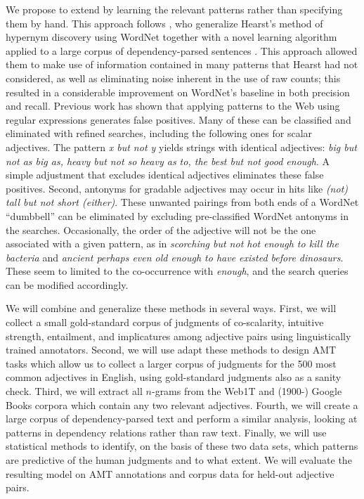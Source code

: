 \documentclass[10pt]{article}
\begin{document}
We propose to extend \cite{sheinmanetal2013} by learning the relevant patterns rather than specifying them by hand. 
This approach follows \cite{snow04,snow2006semantic}, who generalize Hearst's \cite{hearst1992automatic} method of hypernym discovery using WordNet together with a novel learning algorithm applied to a large corpus of dependency-parsed sentences \cite{de2006generating}.
 This approach allowed them to make use of information contained in many patterns that Hearst had not considered, as well as eliminating noise inherent in the use of raw counts; this resulted in a considerable improvement on WordNet's baseline in both precision and recall. 
 Previous work has shown that applying patterns to the Web using regular expressions generates false positives. Many of these can be classified and eliminated with refined searches, including the following ones for scalar adjectives. 
The pattern \emph{x but not y} yields strings with identical adjectives: \emph{big but not as big as, heavy but not so heavy as to, the best but not good enough}. A simple adjustment that excludes identical adjectives eliminates these false positives. Second, antonyms for gradable adjectives may occur in hits like \emph{(not) tall but not short (either)}.  These unwanted pairings from both ends of a WordNet “dumbbell” can be eliminated by excluding pre-classified WordNet antonyms in the searches. Occasionally, the order of the adjective will not be the one associated with a given pattern, as in \emph{scorching but not hot enough to kill the bacteria} and \emph{ancient perhaps even old enough to have existed before dinosaurs}. These seem to limited to the co-occurrence with \emph{enough}, and the search queries can be modified accordingly.

We will combine and generalize these methods in several ways. First, we will collect a small gold-standard corpus of judgments of co-scalarity, intuitive strength, entailment, and implicatures among adjective pairs using linguistically trained annotators. Second, we will use adapt these methods to design AMT tasks which allow us to collect a larger corpus of judgments for the 500 most common adjectives in English, using gold-standard judgments also as a sanity check. Third, we will extract all $n$-grams from the Web1T and (1900-) Google Books corpora which contain any two relevant adjectives. Fourth, we will create a large corpus of dependency-parsed text and perform a similar analysis, looking at patterns in dependency relations rather than raw text. Finally, we will use statistical methods to identify, on the basis of these two data sets, which patterns are predictive of the human judgments and to what extent. We will evaluate the resulting model on AMT annotations and corpus data for held-out adjective pairs. 
\end{document}
